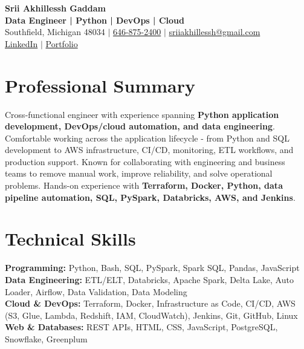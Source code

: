 \documentclass[letterpaper,10pt]{article}
\begin{document}
\fontsize{9.35pt}{10.45pt}\selectfont

\begin{center}
    {\LARGE \textbf{Srii Akhillessh Gaddam}} \\[-1pt]
    \textbf{Data Engineer | Python | DevOps | Cloud} \\[2pt]
    Southfield, Michigan 48034 $|$
    \href{tel:6468752400}{646-875-2400} $|$
    \href{mailto:sriiakhillessh@gmail.com}{sriiakhillessh@gmail.com} \\[1pt]
    \href{https://www.linkedin.com/in/srii-akhiilessh-gaddam-b48668191/}{LinkedIn} $|$
    \href{https://sriiakhillesshg.github.io/portfolio/}{Portfolio}
\end{center}
\vspace{-8pt}

\section{Professional Summary}
\small{Cross-functional engineer with experience spanning \textbf{Python application development, DevOps/cloud automation, and data engineering}. Comfortable working across the application lifecycle - from Python and SQL development to AWS infrastructure, CI/CD, monitoring, ETL workflows, and production support. Known for collaborating with engineering and business teams to remove manual work, improve reliability, and solve operational problems. Hands-on experience with \textbf{Terraform, Docker, Python, data pipeline automation, SQL, PySpark, Databricks, AWS, and Jenkins}.}

\section{Technical Skills}
\small{
\textbf{Programming:} Python, Bash, SQL, PySpark, Spark SQL, Pandas, JavaScript \\
\textbf{Data Engineering:} ETL/ELT, Databricks, Apache Spark, Delta Lake, Auto Loader, Airflow, Data Validation, Data Modeling \\
\textbf{Cloud \& DevOps:} Terraform, Docker, Infrastructure as Code, CI/CD, AWS (S3, Glue, Lambda, Redshift, IAM, CloudWatch), Jenkins, Git, GitHub, Linux \\
\textbf{Web \& Databases:} REST APIs, HTML, CSS, JavaScript, PostgreSQL, Snowflake, Greenplum
}
\end{document}
